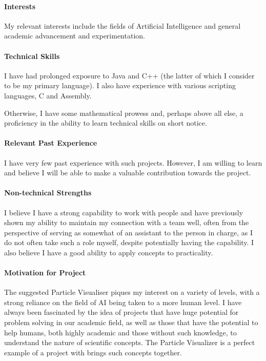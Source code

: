 \documentclass[12pt]{article}
\begin{document}
\paragraph{Interests}
My relevant interests include the fields of Artificial Intelligence and general academic advancement and experimentation.
\paragraph{Technical Skills}
I have had prolonged exposure to Java and C++ (the latter of which I consider to be my primary language). I also have experience with various scripting languages, C and Assembly.

Otherwise, I have some mathematical prowess and, perhaps above all else, a proficiency in the ability to learn technical skills on short notice.
\paragraph{Relevant Past Experience}
I have very few past experience with such projects. However, I am willing to learn and believe I will be able to make a valuable contribution towards the project.

\paragraph{Non-technical Strengths}
I believe I have a strong capability to work with people and have previously shown my ability to maintain my connection with a team well, often from the perspective of serving as somewhat of an assistant to the person in charge, as I do not often take such a role myself, despite potentially having the capability. 
\newline I also believe I have a good ability to apply concepts to practicality.
\paragraph{Motivation for Project}
The suggested Particle Visualiser piques my interest on a variety of levels, with a strong reliance on the field of AI being taken to a more human level. I have always been fascinated by the idea of projects that have huge potential for problem solving in our academic field, as well as those that have the potential to help humans, both highly academic and those without such knowledge, to understand the nature of scientific concepts. The Particle Visualizer is a perfect example of a project with brings such concepts together.
\end{document}
